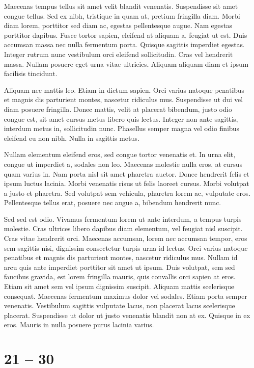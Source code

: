 \documentclass[12pt, a4paper]{article}
\begin{document}
Maecenas tempus tellus sit amet velit blandit venenatis. Suspendisse sit amet congue tellus. Sed ex nibh, tristique in quam at, pretium fringilla diam. Morbi diam lorem, porttitor sed diam ac, egestas pellentesque augue. Nam egestas porttitor dapibus. Fusce tortor sapien, eleifend at aliquam a, feugiat ut est. Duis accumsan massa nec nulla fermentum porta. Quisque sagittis imperdiet egestas. Integer rutrum nunc vestibulum orci eleifend sollicitudin. Cras vel hendrerit massa. Nullam posuere eget urna vitae ultricies. Aliquam aliquam diam et ipsum facilisis tincidunt.

Aliquam nec mattis leo. Etiam in dictum sapien. Orci varius natoque penatibus et magnis dis parturient montes, nascetur ridiculus mus. Suspendisse ut dui vel diam posuere fringilla. Donec mattis, velit at placerat bibendum, justo odio congue est, sit amet cursus metus libero quis lectus. Integer non ante sagittis, interdum metus in, sollicitudin nunc. Phasellus semper magna vel odio finibus eleifend eu non nibh. Nulla in sagittis metus.

Nullam elementum eleifend eros, sed congue tortor venenatis et. In urna elit, congue ut imperdiet a, sodales non leo. Maecenas molestie nulla eros, at cursus quam varius in. Nam porta nisl sit amet pharetra auctor. Donec hendrerit felis et ipsum luctus lacinia. Morbi venenatis risus ut felis laoreet cursus. Morbi volutpat a justo et pharetra. Sed volutpat sem vehicula, pharetra lorem ac, vulputate eros. Pellentesque tellus erat, posuere nec augue a, bibendum hendrerit nunc.

Sed sed est odio. Vivamus fermentum lorem ut ante interdum, a tempus turpis molestie. Cras ultrices libero dapibus diam elementum, vel feugiat nisl suscipit. Cras vitae hendrerit orci. Maecenas accumsan, lorem nec accumsan tempor, eros sem sagittis nisi, dignissim consectetur turpis urna id lectus. Orci varius natoque penatibus et magnis dis parturient montes, nascetur ridiculus mus. Nullam id arcu quis ante imperdiet porttitor sit amet ut ipsum. Duis volutpat, sem sed faucibus gravida, est lorem fringilla mauris, quis convallis orci sapien at eros. Etiam sit amet sem vel ipsum dignissim suscipit. Aliquam mattis scelerisque consequat. Maecenas fermentum maximus dolor vel sodales. Etiam porta semper venenatis. Vestibulum sagittis vulputate lacus, non placerat lacus scelerisque placerat. Suspendisse ut dolor ut justo venenatis blandit non at ex. Quisque in ex eros. Mauris in nulla posuere purus lacinia varius.

\section{21 -- 30}
\end{document}
